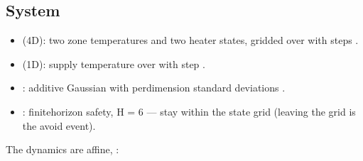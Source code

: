 \documentclass[a4paper,10pt,english]{sphinxmanual}
\begin{document}
\subsection{System}
\label{\detokenize{benchmarks/BA:system}}\begin{itemize}
\item {} 
\sphinxAtStartPar
{} (4D): two zone temperatures and two heater states, gridded over
 with steps .

\item {} 
\sphinxAtStartPar
{} (1D): supply temperature over \sphinxcode{\sphinxupquote{{[}17,20{]}}} with step .

\item {} 
\sphinxAtStartPar
{}: additive Gaussian with per\sphinxhyphen{}dimension standard deviations
.

\item {} 
\sphinxAtStartPar
{}: finite\sphinxhyphen{}horizon safety, H = 6 — stay within the state grid
(leaving the grid is the avoid event).

\end{itemize}

\sphinxAtStartPar
The dynamics are affine, :
\end{document}
